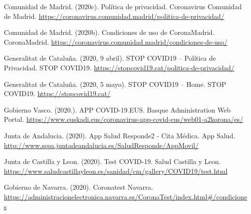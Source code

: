 \documentclass[11pt,a4paper,spanish]{article}
\begin{document}
Comunidad de Madrid. (2020c). Política de privacidad. Coronavirus Comunidad de Madrid. \url{https://coronavirus.comunidad.madrid/politica-de-privacidad/}

Comunidad de Madrid. (2020b). Condiciones de uso de CoronaMadrid. CoronaMadrid. \url{https://coronavirus.comunidad.madrid/condiciones-de-uso/}

Generalitat de Cataluña. (2020, 9 abril). STOP COVID19 – Política de Privacidad. STOP COVID19. \url{https://stopcovid19.cat/politica-de-privacidad/}

Generalitat de Cataluña. (2020, 5 mayo). STOP COVID19 – Home. STOP COVID19. \url{https://stopcovid19.cat/}

Gobierno Vasco. (2020.). APP COVID-19.EUS. Basque Administration Web Portal. \url{https://www.euskadi.eus/coronavirus-app-covid-eus/web01-a2korona/es/}

Junta de Andalucia. (2020). App Salud Responde2 - Cita Médica. App Salud. \url{http://www.sspa.juntadeandalucia.es/SaludResponde/AppMovil/}

Junta de Castilla y Leon. (2020). Test COVID-19. Salud Castilla y Leon. \url{https://www.saludcastillayleon.es/sanidad/cm/gallery/COVID19/test.html}

Gobierno de Navarra. (2020). Coronatest Navarra. \url{https://administracionelectronica.navarra.es/CoronaTest/index.html#/condiciones}
\end{document}
